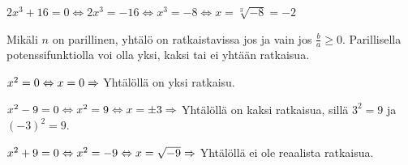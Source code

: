 \begin{esimerkki}
	$2x^3 + 16 = 0 \Leftrightarrow 2x^3 = -16 \Leftrightarrow x^3 = -8  \Leftrightarrow x = \sqrt[3]{-8} = -2 $
\end{esimerkki}

Mikäli $n$ on parillinen, yhtälö on ratkaistavissa jos ja vain jos $\frac{b}{a} \geq 0 $. Parillisella potenssifunktiolla voi olla yksi, kaksi tai ei yhtään ratkaisua.

\begin{esimerkki}
	$x^2 = 0 \Leftrightarrow x = 0 \\
	\Rightarrow$ Yhtälöllä on yksi ratkaisu.
\end{esimerkki}

\begin{esimerkki}
	$x^2 - 9 = 0 \Leftrightarrow x^2 = 9 \Leftrightarrow x = \pm 3 \\
	\Rightarrow$ Yhtälöllä on kaksi ratkaisua, sillä $3^2 = 9$ ja $(-3)^2 = 9$.
\end{esimerkki}

\begin{esimerkki}
	$x^2 + 9 = 0 \Leftrightarrow x^2 = -9 \Leftrightarrow x = \sqrt{-9} \\
	\Rightarrow$ Yhtälöllä ei ole reaalista ratkaisua.
\end{esimerkki}
